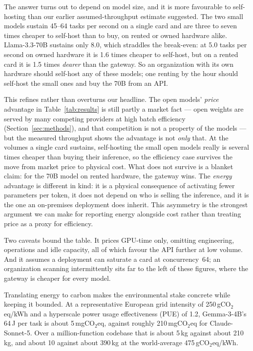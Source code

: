 \documentclass[computers,article,submit,moreauthors]{Definitions/mdpi}
\begin{document}
The answer turns out to depend on model size, and it is more favourable to self-hosting than our earlier assumed-throughput estimate suggested. The two small models sustain 45--64 tasks per second on a single card and are three to seven times cheaper to self-host than to buy, on rented or owned hardware alike. Llama-3.3-70B sustains only 8.0, which straddles the break-even: at 5.0 tasks per second on owned hardware it is 1.6 times cheaper to self-host, but on a rented card it is 1.5 times \emph{dearer} than the gateway. So an organization with its own hardware should self-host any of these models; one renting by the hour should self-host the small ones and buy the 70B from an API.

This refines rather than overturns our headline. The open models' \emph{price} advantage in Table~\ref{tab:results} is still partly a market fact --- open weights are served by many competing providers at high batch efficiency (Section~\ref{sec:methods}), and that competition is not a property of the models --- but the measured throughput shows the advantage is not \emph{only} that. At the volumes a single card sustains, self-hosting the small open models really is several times cheaper than buying their inference, so the efficiency case survives the move from market price to physical cost. What does not survive is a blanket claim: for the 70B model on rented hardware, the gateway wins. The \emph{energy} advantage is different in kind: it is a physical consequence of activating fewer parameters per token, it does not depend on who is selling the inference, and it is the one an on-premises deployment does inherit. This asymmetry is the strongest argument we can make for reporting energy alongside cost rather than treating price as a proxy for efficiency.

Two caveats bound the table. It prices GPU-time only, omitting engineering, operations and idle capacity, all of which favour the API further at low volume. And it assumes a deployment can saturate a card at concurrency~64; an organization scanning intermittently sits far to the left of these figures, where the gateway is cheaper for every model.

Translating energy to carbon makes the environmental stake concrete while keeping it bounded. At a representative European grid intensity of 250\,gCO$_2$eq/kWh and a hyperscale power usage effectiveness (PUE) of 1.2, Gemma-3-4B's 64\,J per task is about 5\,mgCO$_2$eq, against roughly 210\,mgCO$_2$eq for Claude-Sonnet-5. Over a million-function codebase that is about 5\,kg against about 210\,kg, and about 10 against about 390\,kg at the world-average 475\,gCO$_2$eq/kWh.
\end{document}
